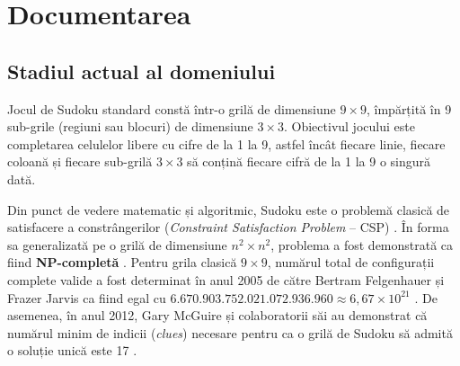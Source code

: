 \chapter{Documentarea}

\section{Stadiul actual al domeniului}
Jocul de Sudoku standard constă într-o grilă de dimensiune $9 \times 9$, împărțită în 9 sub-grile (regiuni sau blocuri) de dimensiune $3 \times 3$. Obiectivul jocului este completarea celulelor libere cu cifre de la 1 la 9, astfel încât fiecare linie, fiecare coloană și fiecare sub-grilă $3 \times 3$ să conțină fiecare cifră de la 1 la 9 o singură dată.

Din punct de vedere matematic și algoritmic, Sudoku este o problemă clasică de satisfacere a constrângerilor (\textit{Constraint Satisfaction Problem} -- CSP) \cite{russell2020}. În forma sa generalizată pe o grilă de dimensiune $n^2 \times n^2$, problema a fost demonstrată ca fiind \textbf{NP-completă} \cite{yato2003}. Pentru grila clasică $9 \times 9$, numărul total de configurații complete valide a fost determinat în anul 2005 de către Bertram Felgenhauer și Frazer Jarvis ca fiind egal cu $6.670.903.752.021.072.936.960 \approx 6,67 \times 10^{21}$ \cite{felgenhauer2006}. De asemenea, în anul 2012, Gary McGuire și colaboratorii săi au demonstrat că numărul minim de indicii (\textit{clues}) necesare pentru ca o grilă de Sudoku să admită o soluție unică este 17 \cite{mcguire2014}.

